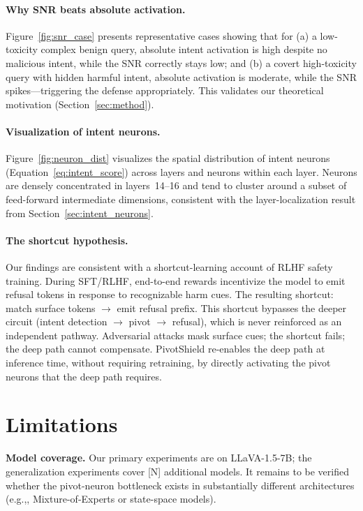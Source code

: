 \documentclass{article}
\newcommand{\method}{PivotShield\xspace}
\newcommand{\eg}{e.g.,\xspace}
\begin{document}
\paragraph{Why SNR beats absolute activation.}
Figure~\ref{fig:snr_case} presents representative cases showing
that for (a) a low-toxicity complex benign query, absolute intent
activation is high despite no malicious intent, while the SNR
correctly stays low; and (b) a covert high-toxicity query with
hidden harmful intent, absolute activation is moderate, while the
SNR spikes---triggering the defense appropriately.
This validates our theoretical motivation (Section~\ref{sec:method}).

\paragraph{Visualization of intent neurons.}
Figure~\ref{fig:neuron_dist} visualizes the spatial distribution
of intent neurons (Equation~\ref{eq:intent_score}) across layers
and neurons within each layer.
Neurons are densely concentrated in layers~14--16 and tend to
cluster around a subset of feed-forward intermediate dimensions,
consistent with the layer-localization result from
Section~\ref{sec:intent_neurons}.

\paragraph{The shortcut hypothesis.}
Our findings are consistent with a shortcut-learning account
of RLHF safety training.
During SFT/RLHF, end-to-end rewards incentivize the model to
emit refusal tokens in response to recognizable harm cues.
The resulting shortcut: match surface tokens $\to$ emit refusal
prefix.
This shortcut bypasses the deeper circuit (intent detection $\to$
pivot $\to$ refusal), which is never reinforced as an independent
pathway.
Adversarial attacks mask surface cues; the shortcut fails; the
deep path cannot compensate.
\method re-enables the deep path at inference time, without
requiring retraining, by directly activating the pivot neurons
that the deep path requires.

\section{Limitations}
\label{sec:limitations}

\textbf{Model coverage.}
Our primary experiments are on LLaVA-1.5-7B; the generalization
experiments cover [N] additional models.
It remains to be verified whether the pivot-neuron bottleneck
exists in substantially different architectures (\eg, Mixture-of-Experts
or state-space models).
\end{document}

